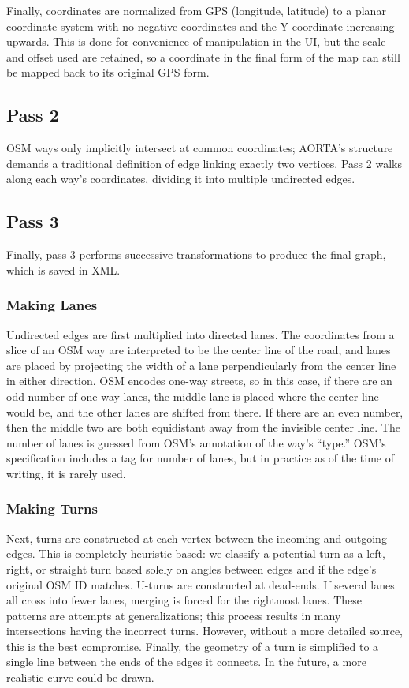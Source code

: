 \documentclass[letterpaper, 10 pt, conference]{ieeeconf}  %
\begin{document}
Finally, coordinates are normalized from GPS (longitude, latitude) to a planar
coordinate system with no negative coordinates and the Y coordinate increasing
upwards. This is done for convenience of manipulation in the UI, but the scale
and offset used are retained, so a coordinate in the final form of the map can
still be mapped back to its original GPS form.

\subsection{Pass 2}

OSM ways only implicitly intersect at common coordinates; AORTA's structure
demands a traditional definition of edge linking exactly two vertices. Pass 2
walks along each way's coordinates, dividing it into multiple undirected edges.

\subsection{Pass 3}

Finally, pass 3 performs successive transformations to produce the final graph,
which is saved in XML.

\subsubsection{Making Lanes}

Undirected edges are first multiplied into directed lanes. The coordinates from
a slice of an OSM way are interpreted to be the center line of the road, and
lanes are placed by projecting the width of a lane perpendicularly from the
center line in either direction. OSM encodes one-way streets, so in this case,
if there are an odd number of one-way lanes, the middle lane is placed where the
center line would be, and the other lanes are shifted from there. If there are
an even number, then the middle two are both equidistant away from the invisible
center line. The number of lanes is guessed from OSM's annotation of the way's
``type.'' OSM's specification includes a tag for number of lanes, but in
practice as of the time of writing, it is rarely used.

\subsubsection{Making Turns}

Next, turns are constructed at each vertex between the incoming and outgoing
edges. This is completely heuristic based: we classify a potential turn as a
left, right, or straight turn based solely on angles between edges and if the
edge's original OSM ID matches. U-turns are constructed at dead-ends. If several
lanes all cross into fewer lanes, merging is forced for the rightmost lanes.
These patterns are attempts at generalizations; this process results in many
intersections having the incorrect turns. However, without a more detailed
source, this is the best compromise. Finally, the geometry of a turn is
simplified to a single line between the ends of the edges it connects.
In the future, a more realistic curve could be drawn.
\end{document}
